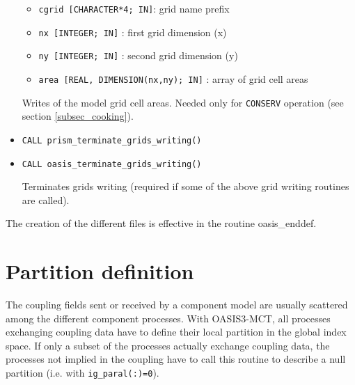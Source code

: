 \begin{itemize}
 \begin{itemize}
    \item {\tt cgrid [CHARACTER*4; IN]}: grid name prefix
    \item {\tt nx [INTEGER; IN]} : first grid dimension (x)
    \item {\tt ny [INTEGER; IN]} : second grid dimension (y)
    \item {\tt area [REAL, DIMENSION(nx,ny); IN]} : array of grid cell areas
 \end{itemize}
Writes of the model grid cell areas. Needed only for {\tt CONSERV}
operation (see section \ref{subsec_cooking}).

\vspace{0.2cm}
\item {\tt CALL prism\_terminate\_grids\_writing()}
\item {\tt CALL oasis\_terminate\_grids\_writing()}

Terminates grids writing (required if some of the above grid writing
routines are called).

\end{itemize}

The creation of the different files is effective in the routine oasis\_enddef.

\section{Partition definition}
\label{subsubsec_Partition}


The coupling fields sent or received by a component model are usually
scattered among the different component processes. With OASIS3-MCT,
all processes exchanging coupling data have to define their local
partition in the global index space. If only a subset of the processes
actually exchange coupling data, the processes not implied in the
coupling have to call this routine to describe a null partition (i.e. with {\tt ig\_paral(:)=0}).

